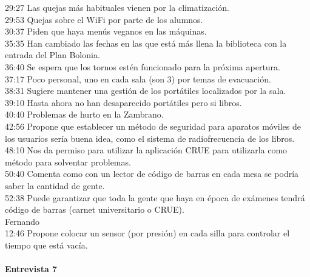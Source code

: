 \documentclass[12pt]{article}
\begin{document}
29:27 Las quejas más habituales vienen por la climatización.\\
29:53 Quejas sobre el WiFi por parte de los alumnos.\\
30:37 Piden que haya menús veganos en las máquinas.\\
35:35 Han cambiado las fechas en las que está más llena la biblioteca con la entrada del Plan Bolonia.\\
36:40 Se espera que los tornos estén funcionado para la próxima apertura.\\
37:17 Poco personal, uno en cada sala (son 3) por temas de evacuación.\\
38:31 Sugiere mantener una gestión de los portátiles localizados por la sala.\\
39:10 Hasta ahora no han desaparecido portátiles pero si libros.\\
40:40 Problemas de hurto en la Zambrano.\\
42:56 Propone que establecer un método de seguridad para aparatos móviles de los usuarios sería buena idea, como el sistema de radiofrecuencia de los libros.\\
48:10 Nos da permiso para utilizar la aplicación CRUE para utilizarla como método para solventar problemas.\\
50:40 Comenta como con un lector de código de barras en cada mesa se podría saber la cantidad de gente.\\
52:38 Puede garantizar que toda la gente que haya en época de exámenes tendrá código de barras (carnet universitario o CRUE).\\

Fernando \\
12:46 Propone colocar un sensor (por presión) en cada silla para controlar el tiempo que está vacía.\\

\paragraph{Entrevista 7}
\end{document}
